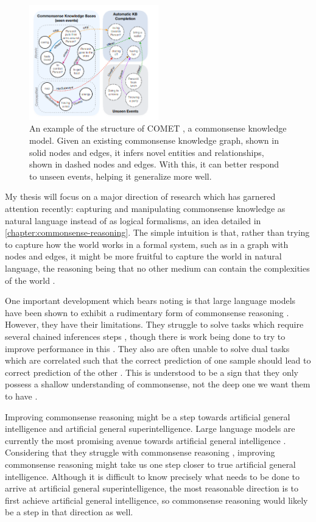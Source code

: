 \documentclass[12pt]{report}
\begin{document}
\begin{figure}
    \includegraphics[width=0.5\textwidth]{diagrams/comet-example.png}
    \caption{An example of the structure of COMET \cite{Bosselut2019-he}, a commonsense knowledge model. Given an existing commonsense knowledge graph, shown in solid nodes and edges, it infers novel entities and relationships, shown in dashed nodes and edges. With this, it can better respond to unseen events, helping it generalize more well.}
    \label{figure:comet}
\end{figure}

My thesis will focus on a major direction of research which has garnered attention recently: capturing and manipulating commonsense knowledge as natural language instead of as logical formalisms, an idea detailed in \cref{chapter:commonsense-reasoning}.
The simple intuition is that, rather than trying to capture how the world works in a formal system, such as in a graph with nodes and edges, it might be more fruitful to capture the world in natural language, the reasoning being that no other medium can contain the complexities of the world \cite{Choi2022-to}.

One important development which bears noting is that large language models have been shown to exhibit a rudimentary form of commonsense reasoning \cite{Zhou2020-wi,Trinh2018-pm,Rajani2019-zk}.
However, they have their limitations.
They struggle to solve tasks which require several chained inferences steps \cite{Zhou2020-wi}, though there is work being done to try to improve performance in this \cite{Wei2022-nf}.
They also are often unable to solve dual tasks which are correlated such that the correct prediction of one sample should lead to correct prediction of the other \cite{Zhou2020-wi}.
This is understood to be a sign that they only possess a shallow understanding of commonsense, not the deep one we want them to have \cite{Zhou2020-wi}.

Improving commonsense reasoning might be a step towards artificial general intelligence and artificial general superintelligence.
Large language models are currently the most promising avenue towards artificial general intelligence \cite{Bubeck2023-gl}.
Considering that they struggle with commonsense reasoning \cite{Zhou2020-wi}, improving commonsense reasoning might take us one step closer to true artificial general intelligence.
Although it is difficult to know precisely what needs to be done to arrive at artificial general superintelligence, the most reasonable direction is to first achieve artificial general intelligence, so commonsense reasoning would likely be a step in that direction as well.
\end{document}
